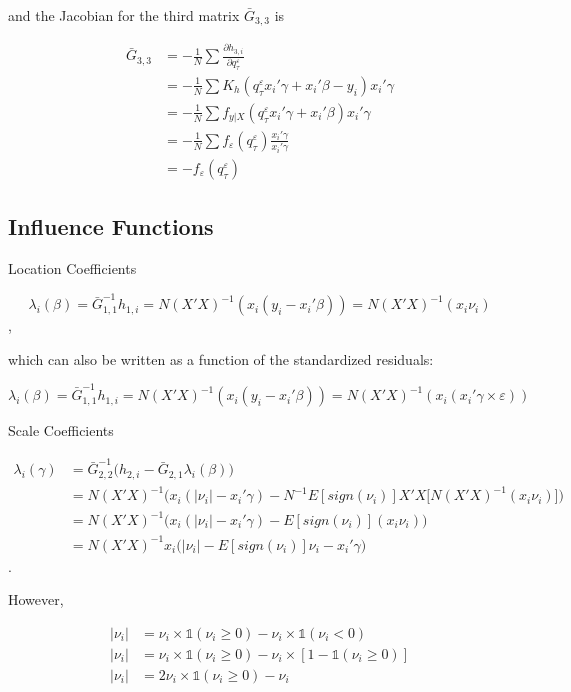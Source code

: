 \documentclass[
  authoryear,
  review,
  1p]{elsarticle}
\begin{document}
and the Jacobian for the third matrix \(\bar G_{3,3}\) is

\[\begin{aligned}
\bar G_{3,3} &= -\frac{1}{N} \sum \frac{\partial h_{3,i}}{\partial q^\varepsilon_\tau} \\
 &= -\frac{1}{N} \sum K_h(q^\varepsilon_\tau x_i'\gamma +x_i'\beta - y_i ) x_i'\gamma \\
 &= -\frac{1}{N} \sum f_{y|X}(q^\varepsilon_\tau x_i'\gamma +x_i'\beta) x_i'\gamma \\
 &= -\frac{1}{N} \sum f_{\varepsilon}(q^\varepsilon_\tau) \frac{x_i'\gamma}{ x_i'\gamma} \\
 &= - f_{\varepsilon}(q^\varepsilon_\tau) 
\end{aligned}
\]

\hypertarget{influence-functions}{%
\subsection{Influence Functions}\label{influence-functions}}

Location Coefficients

\[\lambda_i(\beta) = \bar G^{-1}_{1,1} h_{1,i} = N (X'X)^{-1}(x_i (y_i-x_i'\beta)) = N (X'X)^{-1}(x_i \nu_i)
\],

which can also be written as a function of the standardized residuals:

\[\lambda_i(\beta) = \bar G^{-1}_{1,1} h_{1,i} = N (X'X)^{-1}(x_i (y_i-x_i'\beta)) = N (X'X)^{-1}(x_i ( x_i'\gamma \times \varepsilon))
\]

Scale Coefficients

\[\begin{aligned}
\lambda_i(\gamma)&=\bar G_{2,2}^{-1}\Big(h_{2,i}-\bar G_{2,1} \lambda_i(\beta)\Big) \\
&=N (X'X)^{-1} \Big(x_i(|\nu_i|-x_i' \gamma) 
- N^{-1} E[sign(\nu_i)] X'X \big[ N (X'X)^{-1}(x_i \nu_i) \big] \Big) \\
&=N (X'X)^{-1} \Big(x_i(|\nu_i|-x_i' \gamma) - E[sign(\nu_i)] (x_i \nu_i)  \Big) \\
&=N (X'X)^{-1} x_i \Big( |\nu_i| - E[sign(\nu_i)] \nu_i -x_i' \gamma \Big) 
\end{aligned}
\].

However,

\[\begin{aligned}
|\nu_i| &= \nu_i \times \mathbb{1}(\nu_i \geq 0) - \nu_i \times \mathbb{1}(\nu_i < 0) \\
|\nu_i| &= \nu_i \times \mathbb{1}(\nu_i \geq 0) - \nu_i \times [1-\mathbb{1}(\nu_i \geq 0)] \\
|\nu_i| &= 2 \nu_i \times \mathbb{1}(\nu_i \geq 0) - \nu_i  
\end{aligned}
\]
\end{document}
